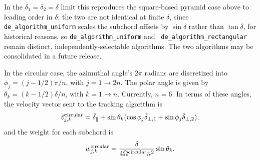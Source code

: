 \documentclass[12pt]{report}
\begin{document}
In the $\delta_1 = \delta_2 = \delta$ limit this reproduces the
square-based pyramid case above to leading order in $\delta$; the two
are not identical at finite $\delta$, since {\tt de\_algorithm\_uniform}
scales the subchord offsets by $\sin \delta$ rather than $\tan \delta$,
for historical reasons, so {\tt de\_algorithm\_uniform} and {\tt
de\_algorithm\_rectangular} remain distinct, independently-selectable
algorithms. The two algorithms may be consolidated in a future release.

In the circular case, the azimuthal angle's $2 \pi$ radians are
discretized into $\phi_{j} = (j - 1/2) \pi / n$, with 
$j = 1 \rightarrow 2n$.  The polar angle is given by
$\theta_{k} = (k - 1/2) \delta / n$, with $k = 1 \rightarrow n$.
Currently, $n = 6$. In terms of these angles, the velocity vector
sent to the tracking algorithm is
\begin{equation}
\vec{v}_{j,k}^{\rm circular} = \hat{\delta}_{\parallel}
+ \sin \theta_{k} ( \cos \phi_{j} \hat{\delta}_{\perp,1}
+ \sin \phi_{j} \hat{\delta}_{\perp,2}),
\end{equation}
and the weight for each subchord is
\begin{equation}
w_{j,k}^{\rm circular} = \frac{ \delta }{4 \Omega^{\rm circular} n^{2}}
\sin \theta_{k}.
\end{equation}
\end{document}
